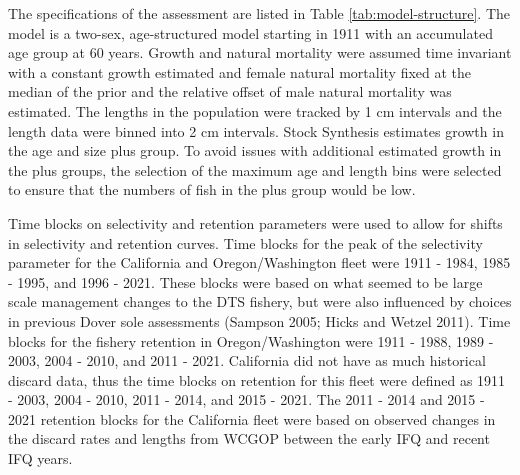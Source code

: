 \documentclass[11pt,
  english,
  a4paper,
]{article}
\begin{document}
The specifications of the assessment are listed in Table \ref{tab:model-structure}. The model is a two-sex, age-structured model starting in 1911 with an accumulated age group at 60 years. Growth and natural mortality were assumed time invariant with a constant growth estimated and female natural mortality fixed at the median of the prior and the relative offset of male natural mortality was estimated. The lengths in the population were tracked by 1 cm intervals and the length data were binned into 2 cm intervals. Stock Synthesis estimates growth in the age and size plus group. To avoid issues with additional estimated growth in the plus groups, the selection of the maximum age and length bins were selected to ensure that the numbers of fish in the plus group would be low.

\leavevmode\tagmcend\tagstructend\par


Time blocks on selectivity and retention parameters were used to allow for shifts in selectivity and retention curves. Time blocks for the peak of the selectivity parameter for the California and Oregon/Washington fleet were 1911 - 1984, 1985 - 1995, and 1996 - 2021. These blocks were based on what seemed to be large scale management changes to the DTS fishery, but were also influenced by choices in previous Dover sole assessments {(Sampson 2005; Hicks and Wetzel 2011)\leavevmode\tagmcend\tagstructend}. Time blocks for the fishery retention in Oregon/Washington were 1911 - 1988, 1989 - 2003, 2004 - 2010, and 2011 - 2021. California did not have as much historical discard data, thus the time blocks on retention for this fleet were defined as 1911 - 2003, 2004 - 2010, 2011 - 2014, and 2015 - 2021. The 2011 - 2014 and 2015 - 2021 retention blocks for the California fleet were based on observed changes in the discard rates and lengths from WCGOP between the early IFQ and recent IFQ years.

\leavevmode\tagmcend\tagstructend\par

\end{document}
